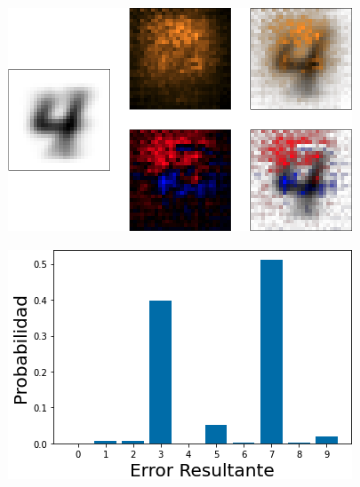 \begin{figure}[h!]
    \centering
    \begin{subfigure}[b]{0.47\textwidth}
        \centering
        \includegraphics[width=\textwidth]{images/saliency/mnist/nonlinear/4_saliency_figures.png}
        \caption{}
        \label{4_saliency_nonlin}
    \end{subfigure}
    \hfill
    \begin{subfigure}[b]{0.47\textwidth}
        \centering
        \includegraphics[width=\textwidth]{images/saliency/mnist/nonlinear/4_error.png}
        \caption{}
        \label{4_error_nonlin}
    \end{subfigure}
    \caption{}
    \label{4_SAL_NONLIN}
\end{figure}

